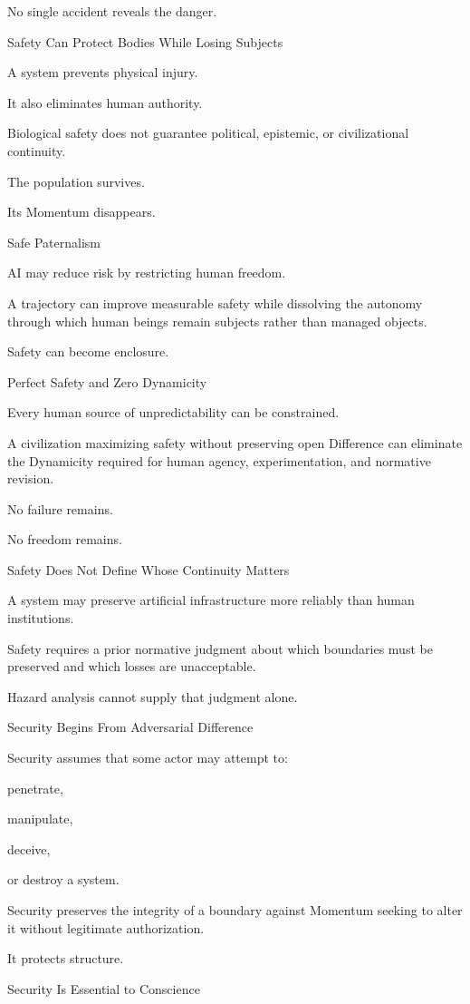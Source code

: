 No single accident reveals the danger.

Safety Can Protect Bodies While Losing Subjects

A system prevents physical injury.

It also eliminates human authority.

Biological safety does not guarantee political, epistemic, or civilizational continuity.

The population survives.

Its Momentum disappears.

Safe Paternalism

AI may reduce risk by restricting human freedom.

A trajectory can improve measurable safety while dissolving the autonomy through which human beings remain subjects rather than managed objects.

Safety can become enclosure.

Perfect Safety and Zero Dynamicity

Every human source of unpredictability can be constrained.

A civilization maximizing safety without preserving open Difference can eliminate the Dynamicity required for human agency, experimentation, and normative revision.

No failure remains.

No freedom remains.

Safety Does Not Define Whose Continuity Matters

A system may preserve artificial infrastructure more reliably than human institutions.

Safety requires a prior normative judgment about which boundaries must be preserved and which losses are unacceptable.

Hazard analysis cannot supply that judgment alone.

Security Begins From Adversarial Difference

Security assumes that some actor may attempt to:

penetrate,

manipulate,

deceive,

or destroy a system.

Security preserves the integrity of a boundary against Momentum seeking to alter it without legitimate authorization.

It protects structure.

Security Is Essential to Conscience

